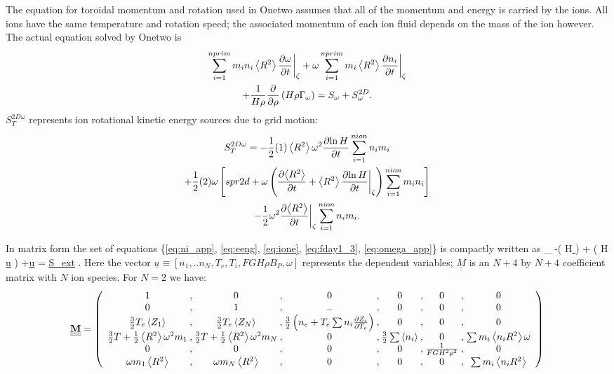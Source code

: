 The equation for toroidal momentum and rotation used in Onetwo assumes that all
of the momentum and energy is carried by the ions. All ions have the same
temperature and rotation speed; the associated momentum of each ion fluid
depends on the mass of the ion however. The actual equation solved by Onetwo is
\begin{multline}
 \sum_{i=1}^{nprim}m_i n_i\left<R^2\right>\frac{\partial{\omega}}{\partial{ t}}\bigg \vert_{\zeta}
 +\omega\sum_{i=1}^{nprim}m_i\left<R^2\right>\frac{\partial{n_i}}{\partial{ t}}\bigg \vert_{\zeta} \\
 +\frac{1}{ H \rho}\frac{\partial}{\partial \rho}\left(H\rho
 \Gamma_\omega\right) 
 = S_\omega  +  S_\omega ^{2D}  \label{eq:omega_app}.
\end{multline}
$S_T^{2D\omega}$ represents ion rotational kinetic energy sources due to grid
motion:
\begin{multline}  
 S_T^{2D\omega}= -\frac{1}{2}(1)\left<R^2\right>\omega^2\frac{\partial{ \ln H}}{\partial{ t}}
 \sum_{i=1}^{nion}n_i m_i \\  
 +\frac{1}{2}(2)\omega\left[ spr2d +\omega\left(\frac{\partial{ \left<R^2\right>}}{\partial{ t}}
 +\left<R^2\right>\frac{\partial{\ln H}}{\partial{ t}}\bigg \vert_{\zeta}\right)
 \sum_{i=1}^{nion}m_in_i \right] \\  
 -\frac{1}{2}\omega^2\frac{\partial{\left<R^2\right>}}{\partial{ t}}\bigg \vert_{\zeta}
 \sum_{i=1}^{nion}n_im_i .
\end{multline}   

In matrix form the set of equations \{\eqref{eq:ni_app}, \eqref{eq:eeng},
\eqref{eq:ione}, \eqref{eq:fday1_3}, \eqref{eq:omega_app}\} is compactly written
as
\beq \label{m1}
 \underline{\underline{}}
 \bigg \vert_ 
 -\ddiff{\rho}\bigg ( H\rho \underline{
 \underline{}} \bigg )
 +\ddiff{\rho}
 \bigg ( H\rho \underline{\underline{}}
 \underline{u} \bigg ) 
 +\underline{\underline{}}\underline{u} = 
 \underline{S_{ext}}  \label{vecform}.
\eeq
Here the vector $\underline{u}  \equiv [n_1,..n_N,T_e,T_i,FGH \rho B_P,\omega] $
represents the dependent variables; $\underline{\underline{M}}$ is an $N+4$ by
$N+4$ coefficient matrix with $N$ ion species. For $ N=2 $ we have:
{\tiny
\[
 \underline{\underline{\mathbf{M}}} = \left( \begin{array}{*{4}{c@{\:,\:}}c@{\;,\;}c}
 1 & 0 & 0 &  0 & 0 & 0  \\
 0 & 1 & ..&  0 & 0 & 0  \\
 \frac{3}{2}T_e\left < Z_1 \right > &\frac{3}{2}T_e \left < Z_N \right > & 
 \frac{3}{2}\left ( n_e  +T_e \sum n_i\pdiff{Z_i}{T_e} \right )
 & 0 & 0 & 0\\
 \frac{3}{2}T+\frac{1}{2}\left < R^2 \right >\omega^2m_1 &
 \frac{3}{2}T+\frac{1}{2}\left < R^2 \right >\omega^2m_N & 
 0&
 \frac{3}{2}\sum\left< n_i \right> & 0 & \sum m_i\left< n_iR^2 \right> \omega \\
 0 & 0 & 0 &0& \frac{1}{FGH^2\rho^2}& 0  \\
 \omega m_1\left<R^2\right> & \omega m_N\left<R^2\right> & 0 & 0 &0& 
 \sum m_i \left< n_i R^2 \right> \\
\end{array} \right)        \]}

